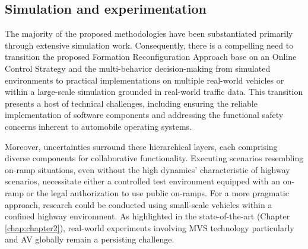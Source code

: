 \subsection*{Simulation and experimentation}




The majority of the proposed methodologies have been substantiated primarily through extensive simulation work. Consequently, there is a compelling need to transition the proposed Formation Reconfiguration Approach base on an Online Control Strategy and the multi-behavior decision-making from simulated environments to practical implementations on multiple real-world vehicles or within a large-scale simulation grounded in real-world traffic data. This transition presents a host of technical challenges, including ensuring the reliable implementation of software components and addressing the functional safety concerns inherent to automobile operating systems.

Moreover, uncertainties surround these hierarchical layers, each comprising diverse components for collaborative functionality. Executing scenarios resembling on-ramp situations, even without the high dynamics' characteristic of highway scenarios, necessitate either a controlled test environment equipped with an on-ramp or the legal authorization to use public on-ramps. For a more pragmatic approach, research could be conducted using small-scale vehicles within a confined highway environment. As highlighted in the state-of-the-art (Chapter \ref{chap:chapter2}), real-world experiments involving MVS technology particularly and AV globally remain a persisting challenge.